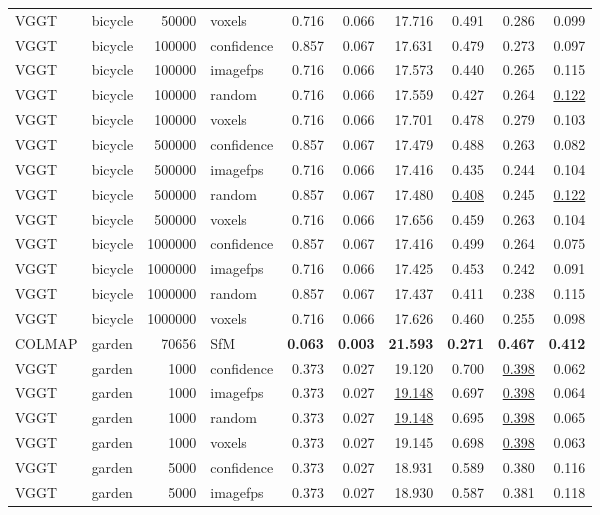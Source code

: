 \begin{table}[H]
\begin{tabular}{llrlrrrrrr}
VGGT & bicycle & 50000 & voxels & 0.716 & 0.066 & 17.716 & 0.491 & 0.286 & 0.099 \\
VGGT & bicycle & 100000 & confidence & 0.857 & 0.067 & 17.631 & 0.479 & 0.273 & 0.097 \\
VGGT & bicycle & 100000 & imagefps & 0.716 & 0.066 & 17.573 & 0.440 & 0.265 & 0.115 \\
VGGT & bicycle & 100000 & random & 0.716 & 0.066 & 17.559 & 0.427 & 0.264 & \underline{0.122} \\
VGGT & bicycle & 100000 & voxels & 0.716 & 0.066 & 17.701 & 0.478 & 0.279 & 0.103 \\
VGGT & bicycle & 500000 & confidence & 0.857 & 0.067 & 17.479 & 0.488 & 0.263 & 0.082 \\
VGGT & bicycle & 500000 & imagefps & 0.716 & 0.066 & 17.416 & 0.435 & 0.244 & 0.104 \\
VGGT & bicycle & 500000 & random & 0.857 & 0.067 & 17.480 & \underline{0.408} & 0.245 & \underline{0.122} \\
VGGT & bicycle & 500000 & voxels & 0.716 & 0.066 & 17.656 & 0.459 & 0.263 & 0.104 \\
VGGT & bicycle & 1000000 & confidence & 0.857 & 0.067 & 17.416 & 0.499 & 0.264 & 0.075 \\
VGGT & bicycle & 1000000 & imagefps & 0.716 & 0.066 & 17.425 & 0.453 & 0.242 & 0.091 \\
VGGT & bicycle & 1000000 & random & 0.857 & 0.067 & 17.437 & 0.411 & 0.238 & 0.115 \\
VGGT & bicycle & 1000000 & voxels & 0.716 & 0.066 & 17.626 & 0.460 & 0.255 & 0.098 \\
\midrule
COLMAP & garden & 70656 & SfM & \textbf{0.063} & \textbf{0.003} & \textbf{21.593} & \textbf{0.271} & \textbf{0.467} & \textbf{0.412} \\
VGGT & garden & 1000 & confidence & 0.373 & 0.027 & 19.120 & 0.700 & \underline{0.398} & 0.062 \\
VGGT & garden & 1000 & imagefps & 0.373 & 0.027 & \underline{19.148} & 0.697 & \underline{0.398} & 0.064 \\
VGGT & garden & 1000 & random & 0.373 & 0.027 & \underline{19.148} & 0.695 & \underline{0.398} & 0.065 \\
VGGT & garden & 1000 & voxels & 0.373 & 0.027 & 19.145 & 0.698 & \underline{0.398} & 0.063 \\
VGGT & garden & 5000 & confidence & 0.373 & 0.027 & 18.931 & 0.589 & 0.380 & 0.116 \\
VGGT & garden & 5000 & imagefps & 0.373 & 0.027 & 18.930 & 0.587 & 0.381 & 0.118 \\

\end{tabular}
\end{table}
